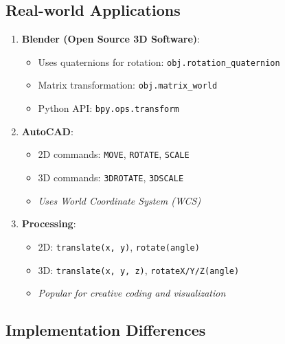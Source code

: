 \documentclass[12pt]{article}
\begin{document}
\subsection{Real-world Applications}

\begin{enumerate}
    \item \textcolor{important}{\textbf{Blender (Open Source 3D Software)}}:
        \begin{itemize}
            \item Uses quaternions for rotation: \texttt{obj.rotation\_quaternion}
            \item Matrix transformation: \texttt{obj.matrix\_world}
            \item Python API: \texttt{bpy.ops.transform}
        \end{itemize}
    
    \item \textcolor{important}{\textbf{AutoCAD}}:
        \begin{itemize}
            \item 2D commands: \texttt{MOVE}, \texttt{ROTATE}, \texttt{SCALE}
            \item 3D commands: \texttt{3DROTATE}, \texttt{3DSCALE}
            \item \textcolor{note}{\textit{Uses World Coordinate System (WCS)}}
        \end{itemize}
        
    \item \textcolor{important}{\textbf{Processing}}:
        \begin{itemize}
            \item 2D: \texttt{translate(x, y)}, \texttt{rotate(angle)}
            \item 3D: \texttt{translate(x, y, z)}, \texttt{rotateX/Y/Z(angle)}
            \item \textcolor{note}{\textit{Popular for creative coding and visualization}}
        \end{itemize}
\end{enumerate}

\subsection{Implementation Differences}
\end{document}
